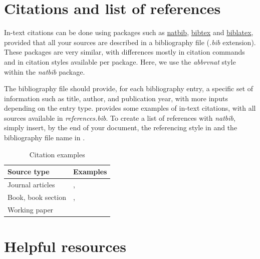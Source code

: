 \documentclass{article} %
\begin{document}
                                                            \section{Citations and list of references}

In-text citations can be done using packages such as \href{https://www.overleaf.com/learn/latex/Bibliography_management_with_natbib}{natbib}, \href{https://www.overleaf.com/learn/latex/Bibliography_management_with_bibtex}{bibtex} and \href{https://www.overleaf.com/learn/latex/Bibliography_management_with_biblatex}{biblatex}, provided that all your sources are described in a bibliography file (\textit{.bib} extension). These packages are very similar, with differences mostly in citation commands and in citation styles available per package. Here, we use the \textit{abbrvnat} style within the \textit{natbib} package. \vspace{1em}

The bibliography file should provide, for each bibliography entry, a specific set of information such as title, author, and publication year, with more inputs depending on the entry type.  provides some examples of in-text citations, with all sources available in \textit{references.bib}. To create a list of references with \textit{natbib}, simply insert, by the end of your document, the referencing style in {\color{Green}{\verb+}{\color{black}{\ldots}}{\color{Green}{\verb+}+}} and the bibliography file name in {\color{Green}{\verb+}{\color{black}{\ldots}}{\color{Green}{\verb+}+}}. 

\begin{table}[H]
\centering
\begin{tabular}{ll}
\toprule
Source type & Examples \\
\midrule
Journal articles & \citet{gaudeul2007open}, \citet{baramidze2013latex} \\
Book, book section & \citet{becker1991treatise}, \citet{becker1960economic}\\
Working paper & \citet{bhalotra2010where}\\
\bottomrule
\end{tabular}
\caption{Citation examples}
\label{table:citations}
\end{table}




\newpage %
\section{Helpful resources}
\vspace{2em}
\end{document}
